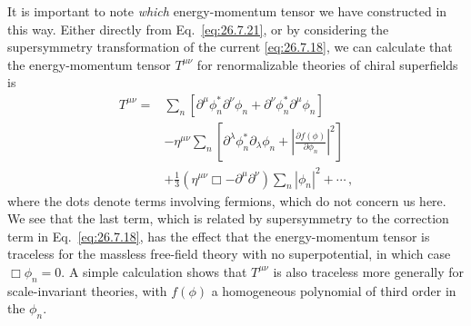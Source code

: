 It is important to note \emph{which} energy-momentum tensor we have
constructed in this way. Either directly from Eq.~\eqref{eq:26.7.21}, or by
considering the supersymmetry transformation of the current
\eqref{eq:26.7.18}, we can calculate that the energy-momentum tensor
\(T^{\mu\nu}\) for renormalizable theories of chiral superfields is
\begin{equation}
  \begin{aligned}
  T^{\mu\nu}
  ={}&\sum_n\left[
       \partial^\mu\phi_n^*\partial^\nu\phi_n
       +\partial^\nu\phi_n^*\partial^\mu\phi_n
      \right]
  \\
   &-\eta^{\mu\nu}\sum_n\left[
       \partial^\lambda\phi_n^*\partial_\lambda\phi_n
       +\left|
          \frac{\partial f(\phi)}{\partial\phi_n}
        \right|^2
      \right]
  \\
   &+\frac13
    (\eta^{\mu\nu}\Box-\partial^\mu\partial^\nu)
    \sum_n|\phi_n|^2+\cdots\,,
  \end{aligned}
  \tag{26.7.48}\label{eq:26.7.48}
\end{equation}
where the dots denote terms involving fermions, which do not concern us here.
We see that the last term, which is related by supersymmetry to the correction
term in Eq.~\eqref{eq:26.7.18}, has the effect that the energy-momentum
tensor is traceless for the massless free-field theory with no
superpotential, in which case \(\Box\phi_n=0\). A simple calculation shows
that \(T^{\mu\nu}\) is also traceless more generally for scale-invariant
theories, with \(f(\phi)\) a homogeneous polynomial of third order in the
\(\phi_n\).

